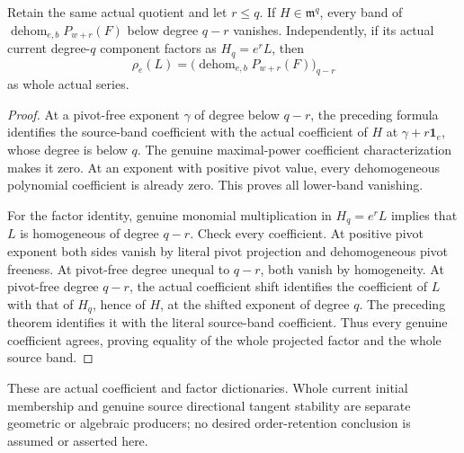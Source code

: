 \begin{theorem}
\label{hir:actual-current-point-factor-source-band-dictionary}
\leanok
Retain the same actual quotient and let $r\le q$. If $H\in\mathfrak m^q$,
every band of $\operatorname{dehom}_{e,b}P_{w+r}(F)$ below degree
$q-r$ vanishes. Independently, if its actual current degree-$q$ component factors as
$H_q=e^rL$, then
\[
 \rho_e(L)=
 \bigl(\operatorname{dehom}_{e,b}P_{w+r}(F)\bigr)_{q-r}
\]
as whole actual series.
\end{theorem}
\begin{proof}
At a pivot-free exponent $\gamma$ of degree below $q-r$, the preceding
formula identifies the source-band coefficient with the actual coefficient
of $H$ at $\gamma+r\mathbf1_e$, whose degree is below $q$.
The genuine maximal-power coefficient characterization makes it zero.
At an exponent with positive pivot value, every dehomogeneous polynomial
coefficient is already zero. This proves all lower-band vanishing.

For the factor identity, genuine monomial multiplication in
$H_q=e^rL$ implies that $L$ is homogeneous of degree $q-r$.
Check every coefficient. At positive pivot exponent both sides vanish by
literal pivot projection and dehomogeneous pivot freeness. At pivot-free
degree unequal to $q-r$, both vanish by homogeneity. At pivot-free degree
$q-r$, the actual coefficient shift identifies the coefficient of $L$
with that of $H_q$, hence of $H$, at the shifted exponent of degree $q$.
The preceding theorem identifies it with the literal source-band
coefficient. Thus every genuine coefficient agrees, proving equality of
the whole projected factor and the whole source band.
\end{proof}

These are actual coefficient and factor dictionaries. Whole current initial
membership and genuine source directional tangent stability are separate
geometric or algebraic producers; no desired order-retention conclusion is
assumed or asserted here.
